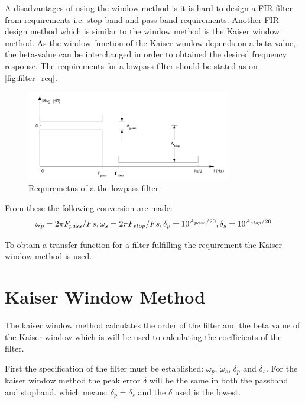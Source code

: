 A disadvantages of using the window method is it is hard to design a FIR filter from requirements i.e. stop-band and pass-band requirements. Another FIR design method which is similar to the window method is the Kaiser window method. As the window function of the Kaiser window depends on a beta-value, the beta-value can be interchanged in order to obtained the desired frequency response. The requirements for a lowpass filter should be stated as on \autoref{fig:filter_req}.
\begin{figure}[H]
\centering
\includegraphics[width=0.8\textwidth]{figures/filter_req.png}
\caption{Requiremetns of a the lowpass filter.}
\label{fig:filter_req}
\end{figure}
From these the following conversion are made:
\begin{equation}
\omega_p=2\pi F_{pass}/Fs,\\
\omega_s=2\pi F_{stop}/Fs,\\
\delta_p=10^{A_{pass}/20},\\
\delta_s=10^{A_{stop}/20}
\end{equation}

To obtain a transfer function for a filter fulfilling the requirement the Kaiser window method is used.

\section{Kaiser Window Method}
The kaiser window method calculates the order of the filter and the beta value of the Kaiser window which is will be used to calculating the coefficients of the filter.

First the specification of the filter must be established: $\omega_p$, $\omega_s$, $\delta_p$ and $\delta_s$. For the kaiser window method the peak error $\delta$ will be the same in both the passband and stopband. which means: $\delta_p = \delta_s$ and the $\delta$ used is the lowest.

